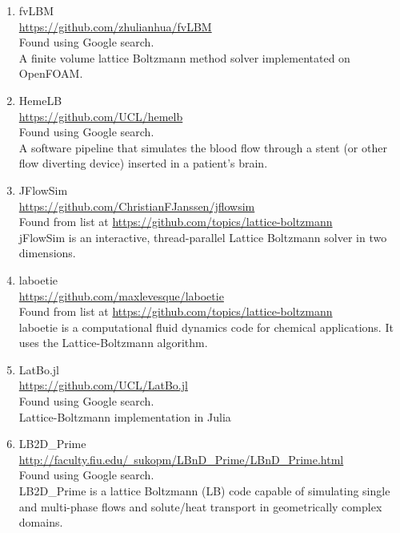 \documentclass{article}
\begin{document}
\begin{enumerate}
\item fvLBM
\\
\href{https://github.com/zhulianhua/fvLBM}{https://github.com/zhulianhua/fvLBM}
\\
Found using Google search.\\
A finite volume lattice Boltzmann method solver implementated on OpenFOAM.

\item HemeLB \\
\href{https://github.com/UCL/hemelb}{https://github.com/UCL/hemelb}
\\
Found using Google search.\\
A software pipeline that simulates the blood flow through a stent (or other flow diverting device) inserted in a patient’s brain.

\item JFlowSim \\
\href{https://github.com/ChristianFJanssen/jflowsim}{https://github.com/ChristianFJanssen/jflowsim} \\
Found from list at \href{https://github.com/topics/lattice-boltzmann}{https://github.com/topics/lattice-boltzmann}\\
jFlowSim is an interactive, thread-parallel Lattice Boltzmann solver in two dimensions.

\item laboetie
\\
\href{https://github.com/maxlevesque/laboetie}{https://github.com/maxlevesque/laboetie}
\\
Found from list at \href{https://github.com/topics/lattice-boltzmann}{https://github.com/topics/lattice-boltzmann}\\
laboetie is a computational fluid dynamics code for chemical applications.
It uses the Lattice-Boltzmann algorithm.

\item LatBo.jl \\
\href{https://github.com/UCL/LatBo.jl}{https://github.com/UCL/LatBo.jl}
\\
Found using Google search.\\
Lattice-Boltzmann implementation in Julia

\item LB2D\_Prime
\\
\href{http://faculty.fiu.edu/~sukopm/LBnD_Prime/LBnD_Prime.html}{http://faculty.fiu.edu/~sukopm/LBnD\_Prime/LBnD\_Prime.html} \\
Found using Google search.\\
LB2D\_Prime is a lattice Boltzmann (LB) code capable of simulating single and multi-phase flows and solute/heat transport in geometrically complex domains.


\end{enumerate}
\end{document}
